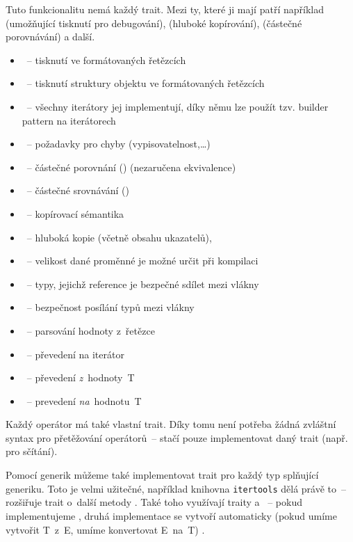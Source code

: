 \documentclass[main.tex]{subfiles}
\begin{document}
Tuto funkcionalitu nemá každý trait. Mezi ty, které ji mají patří například
 (umožňující tisknutí pro debugování),  (hluboké kopírování),
 (částečné porovnávání) a další. \cite[Appendix C]{thebook}


\begin{itemize}
    \item {}~-- tisknutí ve formátovaných řetězcích
    \item {}~-- tisknutí struktury objektu ve formátovaných řetězcích
    \item {}~-- všechny iterátory jej implementují, díky němu lze použít
          tzv. builder pattern na iterátorech
    \item {}~-- požadavky pro chyby (vypisovatelnost,\dots)
    \item {}~-- částečné porovnání (\irust{==}) (nezaručena ekvivalence)
    \item {}~-- částečné srovnávání (\irust{< > <= >=})
    \item {}~-- kopírovací sémantika
    \item {}~-- hluboká kopie (včetně obsahu ukazatelů), 
    \item {}~-- velikost dané proměnné je možné určit při kompilaci
    \item {}~-- typy, jejichž reference je bezpečné sdílet mezi vlákny
    \item {}~-- bezpečnost posílání typů mezi vlákny
    \item {}~-- parsování hodnoty z~řetězce
    \item {}~-- převedení na iterátor
    \item {}~-- převedení \emph{z}~hodnoty~T
    \item {}~-- prevedení \emph{na}~hodnotu~T
\end{itemize}
Každý operátor má také vlastní trait. Díky tomu není potřeba žádná zvláštní syntax pro
přetěžování operátorů~-- stačí pouze implementovat daný trait (např.  pro
sčítání). \cite[sekce\,19.2]{thebook}


Pomocí generik můžeme také implementovat trait pro každý typ splňující generiku. Toto je
velmi užitečné, například knihovna \texttt{itertools} dělá právě to~-- rozšiřuje
 trait o~další metody \cite[itertools, src/itertools/lib.rs]{docsrs}. Také
toho využívají traity  a ~-- pokud implementujeme ,
druhá implementace se vytvoří automaticky (pokud umíme vytvořit T~z~E, umíme konvertovat
E~na~T) \cite[convert/trait.From]{ruststd}.
\end{document}
